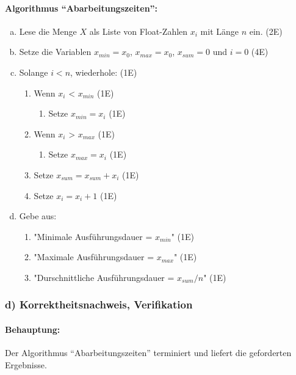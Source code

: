 \documentclass{article}
\begin{document}
    \paragraph*{Algorithmus "`Abarbeitungszeiten"':}
    \begin{enumerate}[(a)]
        \item Lese die Menge $X$ als Liste von Float-Zahlen $x_i$ mit Länge $n$ ein. (2E)
        \item Setze die Variablen $x_{min}=x_0$, $x_{max}=x_0$, $x_{sum}=0$ und $i=0$ (4E)
        \item Solange $i<n$, wiederhole: (1E)
        \begin{enumerate}
            \item Wenn $x_i$ < $x_{min}$ (1E)
            \begin{enumerate}
                \item Setze $x_{min} = x_i$ (1E)
            \end{enumerate}
            \item Wenn $x_i$ > $x_{max}$ (1E)
            \begin{enumerate}
                \item Setze $x_{max} = x_i$ (1E)
            \end{enumerate} 
            \item Setze $x_{sum} = x_{sum} + x_i$ (1E)
            \item Setze $x_i = x_i + 1$ (1E)
        \end{enumerate}
        \item Gebe aus:
        \begin{enumerate}
            \item "Minimale Ausführungsdauer = $x_{min}$" (1E)
            \item "Maximale Ausführungsdauer = $x_{max}$" (1E)
            \item "Durschnittliche Ausführungsdauer = $x_{sum}/n$" (1E)
        \end{enumerate}
    \end{enumerate}


    \subsubsection*{d) Korrektheitsnachweis, Verifikation}
    \paragraph*{Behauptung:}
    Der Algorithmus "`Abarbeitungszeiten"' terminiert und liefert die geforderten Ergebnisse.
\end{document}
